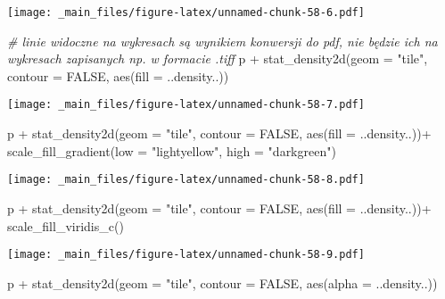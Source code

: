 \documentclass[
]{book}
\newenvironment{Shaded}{\begin{snugshade}}{\end{snugshade}}
\newcommand{\AttributeTok}[1]{\textcolor[rgb]{0.77,0.63,0.00}{#1}}
\newcommand{\CommentTok}[1]{\textcolor[rgb]{0.56,0.35,0.01}{\textit{#1}}}
\newcommand{\ConstantTok}[1]{\textcolor[rgb]{0.00,0.00,0.00}{#1}}
\newcommand{\FunctionTok}[1]{\textcolor[rgb]{0.00,0.00,0.00}{#1}}
\newcommand{\NormalTok}[1]{#1}
\newcommand{\SpecialCharTok}[1]{\textcolor[rgb]{0.00,0.00,0.00}{#1}}
\newcommand{\StringTok}[1]{\textcolor[rgb]{0.31,0.60,0.02}{#1}}
\begin{document}
\texttt{[image: \_main\_files/figure-latex/unnamed-chunk-58-6.pdf]}

\begin{Shaded}
\begin{Highlighting}[]
\CommentTok{\# linie widoczne na wykresach są wynikiem konwersji do pdf, nie będzie ich na wykresach zapisanych np. w formacie .tiff}
\NormalTok{p }\SpecialCharTok{+} \FunctionTok{stat\_density2d}\NormalTok{(}\AttributeTok{geom =} \StringTok{"tile"}\NormalTok{, }\AttributeTok{contour  =}  \ConstantTok{FALSE}\NormalTok{, }\FunctionTok{aes}\NormalTok{(}\AttributeTok{fill  =}\NormalTok{  ..density..))}
\end{Highlighting}
\end{Shaded}

\texttt{[image: \_main\_files/figure-latex/unnamed-chunk-58-7.pdf]}

\begin{Shaded}
\begin{Highlighting}[]
\NormalTok{p }\SpecialCharTok{+} \FunctionTok{stat\_density2d}\NormalTok{(}\AttributeTok{geom =} \StringTok{"tile"}\NormalTok{, }\AttributeTok{contour  =}  \ConstantTok{FALSE}\NormalTok{, }\FunctionTok{aes}\NormalTok{(}\AttributeTok{fill  =}\NormalTok{  ..density..))}\SpecialCharTok{+}
  \FunctionTok{scale\_fill\_gradient}\NormalTok{(}\AttributeTok{low  =}  \StringTok{"lightyellow"}\NormalTok{, }\AttributeTok{high  =}  \StringTok{"darkgreen"}\NormalTok{)}
\end{Highlighting}
\end{Shaded}

\texttt{[image: \_main\_files/figure-latex/unnamed-chunk-58-8.pdf]}

\begin{Shaded}
\begin{Highlighting}[]
\NormalTok{p }\SpecialCharTok{+} \FunctionTok{stat\_density2d}\NormalTok{(}\AttributeTok{geom =} \StringTok{"tile"}\NormalTok{, }\AttributeTok{contour  =}  \ConstantTok{FALSE}\NormalTok{, }\FunctionTok{aes}\NormalTok{(}\AttributeTok{fill  =}\NormalTok{  ..density..))}\SpecialCharTok{+}
  \FunctionTok{scale\_fill\_viridis\_c}\NormalTok{()}
\end{Highlighting}
\end{Shaded}

\texttt{[image: \_main\_files/figure-latex/unnamed-chunk-58-9.pdf]}

\begin{Shaded}
\begin{Highlighting}[]
\NormalTok{p }\SpecialCharTok{+} \FunctionTok{stat\_density2d}\NormalTok{(}\AttributeTok{geom =} \StringTok{"tile"}\NormalTok{, }\AttributeTok{contour  =}  \ConstantTok{FALSE}\NormalTok{, }\FunctionTok{aes}\NormalTok{(}\AttributeTok{alpha  =}\NormalTok{  ..density..))}
\end{Highlighting}
\end{Shaded}
\end{document}
